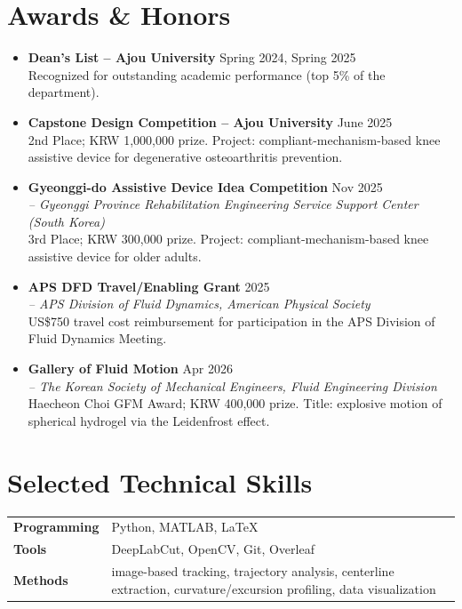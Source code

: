 \documentclass[a4paper,10pt]{article}
\begin{document}
\section*{Awards \& Honors}
\begin{itemize}
  \item \textbf{Dean's List -- Ajou University} \hfill Spring 2024, Spring 2025\\
  Recognized for outstanding academic performance (top 5\% of the department).

  \item \textbf{Capstone Design Competition -- Ajou University} \hfill June 2025\\
  2nd Place; KRW 1,000,000 prize. Project: compliant-mechanism-based knee assistive device for degenerative osteoarthritis prevention.

  \item \textbf{Gyeonggi-do Assistive Device Idea Competition} \hfill Nov 2025\\
  \textit{-- Gyeonggi Province Rehabilitation Engineering Service Support Center (South Korea)}\\
  3rd Place; KRW 300,000 prize. Project: compliant-mechanism-based knee assistive device for older adults.

  \item \textbf{APS DFD Travel/Enabling Grant} \hfill 2025\\
  \textit{-- APS Division of Fluid Dynamics, American Physical Society}\\
  US\$750 travel cost reimbursement for participation in the APS Division of Fluid Dynamics Meeting.

  \item \textbf{Gallery of Fluid Motion} \hfill Apr 2026\\
  \textit{-- The Korean Society of Mechanical Engineers, Fluid Engineering Division}\\
  Haecheon Choi GFM Award; KRW 400,000 prize. Title: explosive motion of spherical hydrogel via the Leidenfrost effect.
\end{itemize}

\section*{Selected Technical Skills}
\begin{tabularx}{\textwidth}{@{}l X@{}}
\textbf{Programming} & Python, MATLAB, LaTeX \\
\textbf{Tools} & DeepLabCut, OpenCV, Git, Overleaf \\
\textbf{Methods} & image-based tracking, trajectory analysis, centerline extraction, curvature/excursion profiling, data visualization \\
\end{tabularx}
\end{document}
